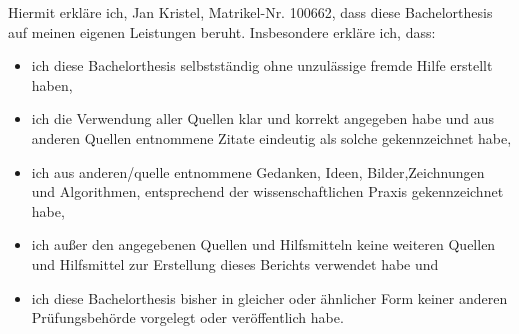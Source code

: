 Hiermit erkläre ich, Jan Kristel, Matrikel-Nr. 100662, dass diese Bachelorthesis auf meinen eigenen Leistungen beruht. Insbesondere erkläre ich, dass:

\begin{itemize}
	\item ich diese Bachelorthesis selbstständig ohne unzulässige fremde Hilfe erstellt haben,
	\item ich die Verwendung aller Quellen klar und korrekt angegeben habe und aus anderen Quellen entnommene Zitate eindeutig als solche gekennzeichnet habe,
	\item ich aus anderen/quelle entnommene Gedanken, Ideen, Bilder,Zeichnungen und Algorithmen, entsprechend der wissenschaftlichen Praxis gekennzeichnet habe,
	\item ich außer den angegebenen Quellen und Hilfsmitteln keine weiteren Quellen und Hilfsmittel zur Erstellung dieses Berichts verwendet habe und
	\item ich diese Bachelorthesis bisher in gleicher oder ähnlicher Form keiner anderen Prüfungsbehörde vorgelegt oder veröffentlich habe.
\end{itemize}


\begin{flushleft}
	\\
\vspace{5mm}
	\makebox[.4\textwidth]{\hrulefill}\hfill\\
\end{flushleft}